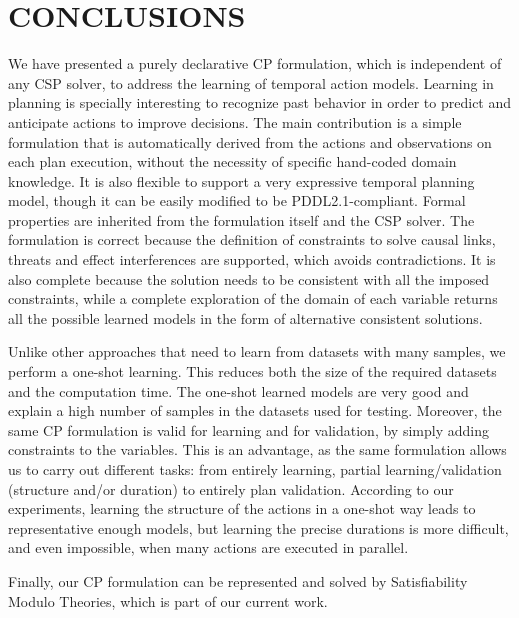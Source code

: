 \documentclass{ecai}
\begin{document}
\section{CONCLUSIONS}
\label{sec:conclusions}


We have presented a purely declarative CP formulation, which is independent of any CSP solver, to address the learning of temporal action models. Learning in planning is specially interesting to recognize past behavior in order to predict and anticipate actions to improve decisions.
The main contribution is a simple formulation that is automatically derived from the actions and observations on each plan execution, without the necessity of specific hand-coded domain knowledge. It is also flexible to support a very expressive temporal planning model, though it can be easily modified to be PDDL2.1-compliant.
Formal properties are inherited from the formulation itself and the CSP solver. The formulation is correct because the definition of constraints to solve causal links, threats and effect interferences are supported, which avoids contradictions. It is also complete because the solution needs to be consistent with all the imposed constraints, while a complete exploration of the domain of each variable returns all the possible learned models in the form of alternative consistent solutions.


Unlike other approaches that need to learn from datasets with many samples, we perform a one-shot learning. This reduces both the size of the required datasets and the computation time. The one-shot learned models are very good and explain a high number of samples in the datasets used for testing. Moreover, the same CP formulation is valid for learning and for validation, by simply adding constraints to the variables. This is an advantage, as the same formulation allows us to carry out different tasks: from entirely learning, partial learning/validation (structure and/or duration) to entirely plan validation.
According to our experiments, learning the structure of the actions in a one-shot way leads to representative enough models, but learning the precise durations is more difficult, and even impossible, when many actions are executed in parallel.


Finally,
our CP formulation can be represented and solved by Satisfiability Modulo Theories, which is part of our current work. 






\end{document}
